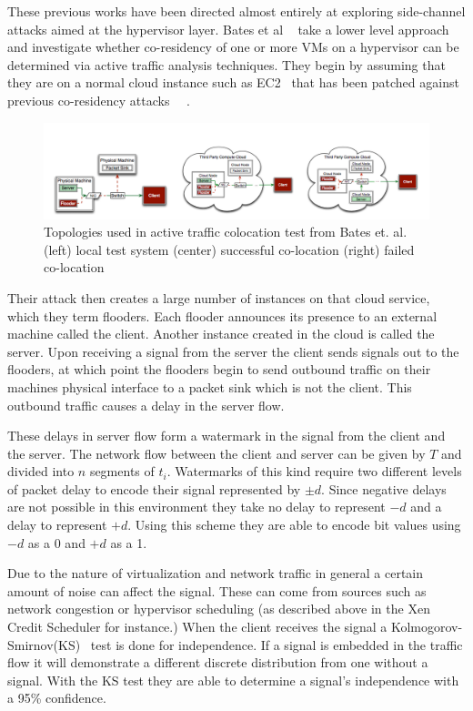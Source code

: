 These previous works have been directed almost entirely at exploring side-channel attacks aimed at the hypervisor layer. Bates et al ~\cite{bates_detecting_2012} take a lower level approach and investigate whether co-residency of one or more VMs on a hypervisor can be determined via active traffic analysis techniques. They begin by assuming that they are on a normal cloud instance such as EC2~\cite{_aws_EC2_2014} that has been patched against previous co-residency attacks ~\cite{zhang_homealone:_2011}~\cite{ristenpart_hey_2009}. 

\begin{figure}\label{BatesNetworkThing}
	  \centering
	  \includegraphics[width=\textwidth]{figures/batesNetwork.png}
	  \caption{Topologies used in active traffic colocation test from Bates et. al. ~\cite{bates_detecting_2012}
	  (left) local test system 	(center) successful co-location   (right) failed co-location }
\end{figure}



Their attack then creates a large number of instances on that cloud service, which they term flooders. Each flooder announces its presence to an external machine called the client. Another instance created in the cloud is called the server. Upon receiving a signal from the server the client sends signals out to the flooders, at which point the flooders begin to send outbound traffic on their machines physical interface to a packet sink which is not the client. This outbound traffic causes a delay in the server flow. 

These delays in server flow form a watermark in the signal from the client and the server. The network flow between the client and server can be given by $T$ and divided into $n$ segments of $t_i$. Watermarks of this kind require two different levels of packet delay to encode their signal represented by $\pm d$. Since negative delays are not possible in this environment they take no delay to represent $-d$ and a delay to represent $+d$. Using this scheme they are able to encode bit values using $-d$ as a 0 and $+d$ as a 1. 

Due to the nature of virtualization and network traffic in general a certain amount of noise can affect the signal. These can come from sources such as network congestion or hypervisor scheduling (as described above in the Xen Credit Scheduler for instance.) When the client receives the signal a Kolmogorov-Smirnov(KS)~\cite{pettitt_kolmogorov-smirnov_1977} test is done for independence. If a signal is embedded in the traffic flow it will demonstrate a different discrete distribution from one without a signal. With the KS test they are able to determine a signal's independence with a 95\% confidence. 

